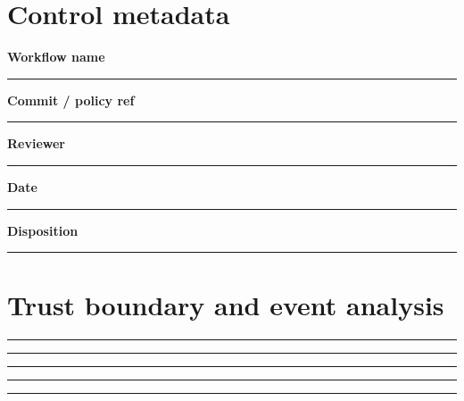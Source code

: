 \documentclass[11pt,letterpaper]{article}
\begin{document}
\makedoctitle\makedocsummary
\section{Control metadata}
\noindent\textbf{Workflow name}\par\nobreak\vspace{6pt}\noindent\rule{0.93\linewidth}{0.4pt}\par\vspace{14pt}
\noindent\textbf{Commit / policy ref}\par\nobreak\vspace{6pt}\noindent\rule{0.93\linewidth}{0.4pt}\par\vspace{14pt}
\noindent\textbf{Reviewer}\par\nobreak\vspace{6pt}\noindent\rule{0.93\linewidth}{0.4pt}\par\vspace{14pt}
\noindent\textbf{Date}\par\nobreak\vspace{6pt}\noindent\rule{0.93\linewidth}{0.4pt}\par\vspace{14pt}
\noindent\textbf{Disposition}\par\nobreak\vspace{6pt}\noindent\rule{0.93\linewidth}{0.4pt}\par\vspace{14pt}
\section{Trust boundary and event analysis}
\vspace{2mm}
\noindent\rule{0.93\linewidth}{0.4pt}\par\vspace{13pt}
\noindent\rule{0.93\linewidth}{0.4pt}\par\vspace{13pt}
\noindent\rule{0.93\linewidth}{0.4pt}\par\vspace{13pt}
\noindent\rule{0.93\linewidth}{0.4pt}\par\vspace{13pt}
\noindent\rule{0.93\linewidth}{0.4pt}\par\vspace{13pt}
\end{document}
